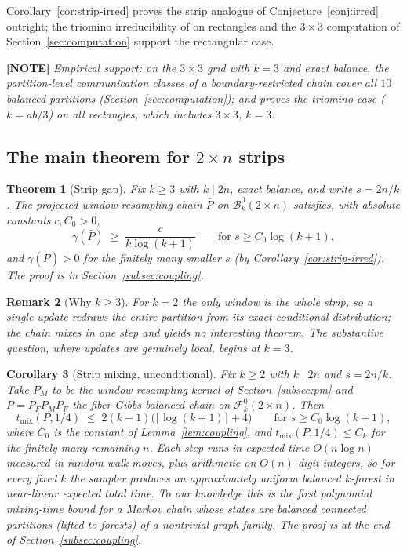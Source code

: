 \documentclass[11pt]{article}
\newcommand{\statusnote}[1]{\medskip\noindent\textcolor{notecol}{\textbf{[NOTE]} \emph{#1}}\medskip}
\newcommand{\Fcal}{\mathcal{F}}
\newcommand{\Bcal}{\mathcal{B}}
\newtheorem{theorem}{Theorem}[section]
\newtheorem{corollary}[theorem]{Corollary}
\newtheorem{remark}[theorem]{Remark}
\begin{document}
Corollary~\ref{cor:strip-irred} proves the strip analogue of
Conjecture~\ref{conj:irred} outright; the triomino irreducibility of
\cite[Thm.~B.13]{akitaya2026bud} on rectangles and the $3 \times 3$
computation of Section~\ref{sec:computation} support the rectangular
case.

\statusnote{Empirical support: on the $3 \times 3$ grid with $k = 3$ and
exact balance, the \emph{partition-level} communication classes of a
boundary-restricted chain cover all $10$ balanced partitions
(Section~\ref{sec:computation}); and \cite[Thm.~B.13]{akitaya2026bud} proves
the triomino case ($k = ab/3$) on all rectangles, which includes
$3 \times 3$, $k = 3$.}

\subsection{The main theorem for $2 \times n$ strips}
\label{subsec:strips}

\begin{theorem}[Strip gap]
\label{conj:strip}
Fix $k \ge 3$ with $k \mid 2n$, exact balance, and write $s = 2n/k$. The
projected window-resampling chain $\bar P$ on $\Bcal_k^0(2 \times n)$
satisfies, with absolute constants $c, C_0 > 0$,
\[
  \gamma(\bar P) \;\ge\; \frac{c}{k \log(k+1)}
  \qquad \text{for } s \ge C_0 \log(k+1),
\]
and $\gamma(\bar P) > 0$ for the finitely many smaller $s$ (by
Corollary~\ref{cor:strip-irred}). The proof is in
Section~\ref{subsec:coupling}.
\end{theorem}

\begin{remark}[Why $k \ge 3$]
\label{rem:k2-trivial}
For $k = 2$ the only window is the whole strip, so a single update
redraws the entire partition from its exact conditional distribution;
the chain mixes in one step and yields no interesting theorem. The
substantive question, where updates are genuinely local, begins at
$k = 3$.
\end{remark}

\begin{corollary}[Strip mixing, unconditional]
\label{cor:strip-mixing}
Fix $k \ge 2$ with $k \mid 2n$ and $s = 2n/k$. Take $P_M$ to be the
window resampling kernel of Section~\ref{subsec:pm} and
$P = P_F P_M P_F$ the fiber-Gibbs balanced chain on
$\Fcal_k^0(2 \times n)$. Then
\[
  t_{\mathrm{mix}}(P, 1/4) \;\le\; 2(k-1)\bigl(\lceil \log(k+1)
  \rceil + 4\bigr)
  \qquad \text{for } s \ge C_0 \log(k+1),
\]
where $C_0$ is the constant of Lemma~\ref{lem:coupling}, and
$t_{\mathrm{mix}}(P, 1/4) \le C_k$ for the finitely many remaining $n$.
Each step runs in expected time $O(n \log n)$ measured in random
walk moves, plus arithmetic on $O(n)$-digit integers, so for every
fixed $k$ the sampler produces an approximately uniform balanced
$k$-forest in near-linear expected total time. To our knowledge this is
the first polynomial mixing-time bound for a Markov chain whose states
are
balanced connected partitions (lifted to forests) of a nontrivial graph
family. The proof is at the end of Section~\ref{subsec:coupling}.
\end{corollary}
\end{document}
